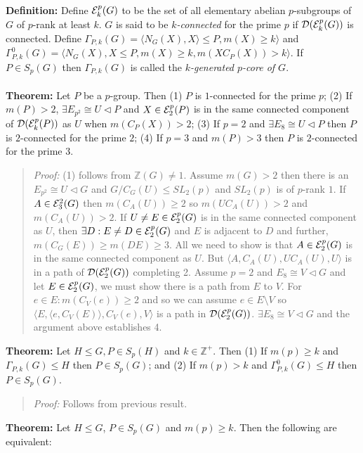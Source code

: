 {\bf Definition:}  Define ${\cal E}_k^p(G)$ to be the set of all elementary abelian
$p$-subgroups of $G$ of $p$-rank at least $k$. $G$ is said to be $k$\emph{-connected}
for the prime $p$ if ${\cal D}({\cal E}_k^p(G))$ is connected.  Define $\Gamma_{P,k}(G) = \langle N_G(X), X \rangle \le P, m(X) \ge k \rangle$ and
$\Gamma_{P,k}^0(G) = \langle N_G(X), X \le P, m(X) \ge k, m(XC_P(X)) > k \rangle$.  If $P \in S_p(G)$ then
$\Gamma_{P,k}(G)$ is called the \emph{$k$-generated $p$-core of $G$}.
\\
\\
{\bf Theorem:} Let $P$ be a $p$-group.  Then (1) $P$ is $1$-connected for the prime $p$;
(2) If $m(P) > 2$, $\exists E_{p^2} \cong U \lhd P$ and $X \in {\cal E}_2^p(P)$ is in
the same connected component of ${\cal D}({\cal E}_k^p(P))$ as $U$ when
$m(C_P(X)) > 2$;
(3) If $p=2$ and $\exists E_{8} \cong U \lhd P$ then $P$ is $2$-connected for the prime $2$;
(4) If $p=3$ and $m(P) > 3$ then $P$ is $2$-connected for the prime $3$.
\begin{quote}
\emph{Proof:}  (1) follows from ${\mathbb Z}(G) \ne 1$.  Assume $m(G) > 2$ then
there is an $E_{p^2} \cong  U \lhd G$ and $G/C_G(U) \le SL_2(p)$ and
$SL_2(p)$ is of $p$-rank $1$.  If $A \in {\cal E}^2_3(G)$ then $m(C_A(U) )  \ge 2$
so $m(UC_A(U)) > 2$ and
$m(C_A(U) ) > 2$.  If $U \ne E \in {\cal E}^p_2(G)$ is in the same connected component
as $U$, then
$\exists D: E \ne D \in {\cal E}^p_2(G)$ and $E$ is adjacent to $D$ and
further,  $m(C_G(E)) \ge m(DE) \ge 3$.  All we need to show is that
$A \in {\cal E}^p_2(G)$ is in the same connected component as $U$. But $\langle A, C_A(U), U C_A(U), U \rangle$ is in a path of
${\cal D}({\cal E}^p_2(G))$ completing 2.
Assume $p = 2$ and $E_8 \cong V \lhd G$ and let
$E \in {\cal E}^p_2(G)$, we must show there is a path from $E$ to $V$.
For $e \in E: m(C_V(e)) \ge 2$ and so we can assume $e \in E \setminus V$ so
$\langle E, \langle e, C_V(E) \rangle, C_V(e), V \rangle$ is a path in
${\cal D}({\cal E}^p_2(G))$.
$\exists E_8 \cong V \lhd G$
and the argument above establishes 4.
\end{quote}
{\bf Theorem:} Let $H \le G, P \in S_p(H)$ and $k \in {\mathbb Z}^+$.  Then
(1) If $m(p) \ge k$ and $\Gamma_{P,k}(G) \le H$ then $P \in S_p(G)$; and
(2) If $m(p) > k$ and $\Gamma_{P,k}^0(G) \le H$ then $P \in S_p(G)$.
\begin{quote}
\emph{Proof:}  Follows from previous result.
\end{quote}
{\bf Theorem:} Let $H \le G$, $P \in S_p(G)$ and $m(p) \ge k$.  Then the following are equivalent:

